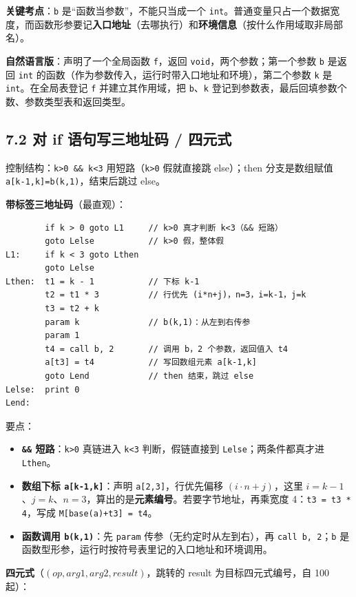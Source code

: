 \documentclass[UTF8,zihao=-4]{ctexart}
\newcommand{\kw}[1]{\texttt{#1}}
\begin{document}
\textbf{关键考点}：\kw{b} 是“函数当参数”，不能只当成一个 \kw{int}。普通变量只占一个数据宽度，而函数形参要记\textbf{入口地址}（去哪执行）和\textbf{环境信息}（按什么作用域取非局部名）。

\textbf{自然语言版}：声明了一个全局函数 \kw{f}，返回 \kw{void}，两个参数；第一个参数 \kw{b} 是返回 \kw{int} 的函数（作为参数传入，运行时带入口地址和环境），第二个参数 \kw{k} 是 \kw{int}。在全局表登记 \kw{f} 并建立其作用域，把 \kw{b}、\kw{k} 登记到参数表，最后回填参数个数、参数类型表和返回类型。


\subsection*{7.2 对 if 语句写三地址码 / 四元式}

控制结构：\kw{k>0 \&\& k<3} 用短路（\kw{k>0} 假就直接跳 else）；then 分支是数组赋值 \kw{a[k-1,k]=b(k,1)}，结束后跳过 else。

\textbf{带标签三地址码}（最直观）：

\begin{lstlisting}
        if k > 0 goto L1     // k>0 真才判断 k<3（&& 短路）
        goto Lelse           // k>0 假，整体假
L1:     if k < 3 goto Lthen
        goto Lelse
Lthen:  t1 = k - 1           // 下标 k-1
        t2 = t1 * 3          // 行优先 (i*n+j)，n=3，i=k-1，j=k
        t3 = t2 + k
        param k              // b(k,1)：从左到右传参
        param 1
        t4 = call b, 2       // 调用 b，2 个参数，返回值入 t4
        a[t3] = t4           // 写回数组元素 a[k-1,k]
        goto Lend            // then 结束，跳过 else
Lelse:  print 0
Lend:
\end{lstlisting}

要点：
\begin{itemize}[leftmargin=2.2em]
  \item \textbf{\kw{\&\&} 短路}：\kw{k>0} 真链进入 \kw{k<3} 判断，假链直接到 \kw{Lelse}；两条件都真才进 \kw{Lthen}。
  \item \textbf{数组下标 \kw{a[k-1,k]}}：声明 \kw{a[2,3]}，行优先偏移 $(i\cdot n+j)$，这里 $i=k-1$、$j=k$、$n=3$，算出的是\textbf{元素编号}。若要字节地址，再乘宽度 4：\kw{t3 = t3 * 4}，写成 \kw{M[base(a)+t3] = t4}。
  \item \textbf{函数调用 \kw{b(k,1)}}：先 \kw{param} 传参（无约定时从左到右），再 \kw{call b, 2}；\kw{b} 是函数型形参，运行时按符号表里记的入口地址和环境调用。
\end{itemize}

\textbf{四元式}（$(op,arg1,arg2,result)$，跳转的 result 为目标四元式编号，自 100 起）：
\end{document}
